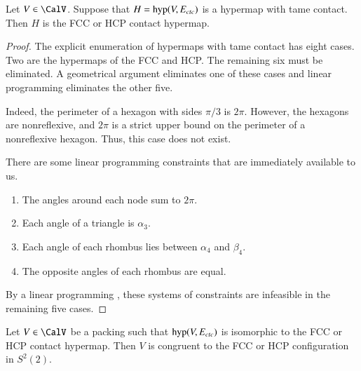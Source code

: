 \documentclass{llncs}
\def\op#1{{\hbox{#1}}}
\begin{document}
\begin{lemma}[]\label{lemma:fcc-ft} Let $V\in \CalV$.
  Suppose that $H=\op{hyp}(V,E_{ctc})$ is a hypermap with tame
  contact.  Then $H$ is the FCC or HCP contact hypermap.
\end{lemma}

\begin{proof} The explicit enumeration of hypermaps with tame
  contact has eight cases.  Two are the hypermaps of the
  FCC and HCP.  The remaining six must be eliminated.  
A geometrical argument  eliminates one of these cases and linear programming
eliminates the other five.

  Indeed, the perimeter of a hexagon with sides $\pi/3$
is $2\pi$.  However, the hexagons are nonreflexive, and $2\pi$ is a strict upper bound on the perimeter of a nonreflexive
hexagon.  Thus, this case does not exist.

\figCXFENOK %


There are some linear
  programming constraints that are immediately available to us.
\begin{enumerate}\wasitemize 
\item The angles around each node sum to $2\pi$.
\item Each angle of a triangle is $\alpha_3$.
\item Each angle of each rhombus lies between $\alpha_4$ and $\beta_4$.
\item The opposite angles of each rhombus are equal.
\end{enumerate}\wasitemize 
By a linear programming ,
these systems of constraints are infeasible in the remaining five cases.
\end{proof}


\begin{lemma}[]\label{lemma:kiss-fcc}
  Let $V\in \CalV$ be a packing such that $\op{hyp}(V,E_{ctc})$ is
  isomorphic to the FCC or HCP contact hypermap.  Then $V$ is
  congruent to the FCC or HCP configuration in $S^2(2)$.
\end{lemma}
%
%
%
%
%
\end{document}
